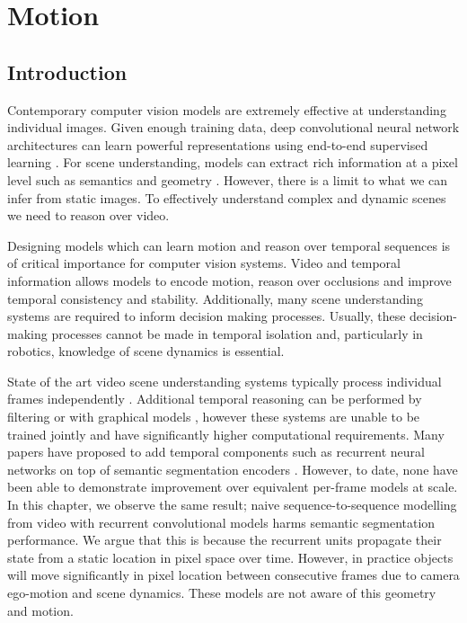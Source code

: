 \chapter{Motion}
\label{motion}

\graphicspath{{Chapter5/Figs/}}


\section{Introduction}
Contemporary computer vision models are extremely effective at understanding individual images. Given enough training data, deep convolutional neural network architectures can learn powerful representations using end-to-end supervised learning \citep{krizhevsky2012imagenet,he2016deep}. For scene understanding, models can extract rich information at a pixel level such as semantics \citep{long2015fully,badrinarayanan2017segnet,he2017maskrcnn} and geometry \citep{eigen2015predicting,garg2016unsupervised}.
However, there is a limit to what we can infer from static images. To effectively understand complex and dynamic scenes we need to reason over video.

Designing models which can learn motion and reason over temporal sequences is of critical importance for computer vision systems. Video and temporal information allows models to encode motion, reason over occlusions and improve temporal consistency and stability. Additionally, many scene understanding systems are required to inform decision making processes. Usually, these decision-making processes cannot be made in temporal isolation and, particularly in robotics, knowledge of scene dynamics is essential.

State of the art video scene understanding systems typically process individual frames independently \citep{he2017maskrcnn,zhao2017pspnet,eigen2015predicting,zhou2017unsupervised,patraucean2015spatio,valipour2017recurrent,gadde2017semantic}. Additional temporal reasoning can be performed by filtering \citep{miksik2013efficient} or with graphical models \citep{de2012line,chen2011temporally,tripathi2015semantic,hur2016joint}, however these systems are unable to be trained jointly and have significantly higher computational requirements. Many papers have proposed to add temporal components such as recurrent neural networks \citep{hochreiter1997long} on top of semantic segmentation encoders \citep{patraucean2015spatio,valipour2017recurrent}. However, to date, none have been able to demonstrate improvement over equivalent per-frame models at scale. In this chapter, we observe the same result; naive sequence-to-sequence modelling from video with recurrent convolutional models harms semantic segmentation performance. We argue that this is because the recurrent units propagate their state from a static location in pixel space over time. However, in practice objects will move significantly in pixel location between consecutive frames due to camera ego-motion and scene dynamics. These models are not aware of this geometry and motion.

